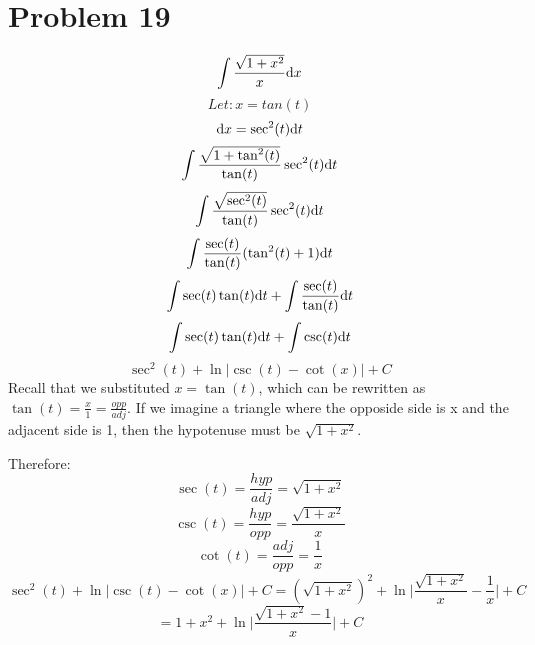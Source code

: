 \documentclass[letterpaper, 12pt]{math}
\begin{document}
\section*{Problem 19}
\[ \int{\frac{\sqrt{1+x^{2}}}{x}\mathrm{d}{x}} \]
\[ Let: x = tan(t) \]
\[ \mathrm{d}{x} = \sec^{2}(t)\mathrm{d}{t} \]
\[ \int{\frac{\sqrt{1+\tan^{2}(t)}}{\tan(t)}\sec^{2}(t)\mathrm{d}{t}} \]
\[ \int{\frac{\sqrt{\sec^{2}(t)}}{\tan(t)}\sec^{2}(t)\mathrm{d}{t}} \]
\[ \int{\frac{\sec(t)}{\tan(t)}(\tan^{2}(t)+1)\mathrm{d}{t}} \]
\[ \int{\sec(t)\tan(t)\mathrm{d}{t}}+\int{\frac{\sec(t)}{\tan(t)}\mathrm{d}{t}} \]
\[ \int{\sec(t)\tan(t)\mathrm{d}{t}}+\int{\csc(t)}\mathrm{d}{t} \]
\[ \sec^{2}(t)+\ln|\csc(t)-\cot(x)|+C \]
Recall that we substituted \( x=\tan(t) \), which can be rewritten as
\( \tan(t) = \frac{x}{1} = \frac{opp}{adj} \). If we imagine a triangle where
the opposide side is x and the adjacent side is 1, then the hypotenuse must be
\( \sqrt{1+x^{2}} \).
\begin{center}
\end{center}
Therefore:
\[ \sec(t) = \frac{hyp}{adj} = \sqrt{1+x^{2}} \]
\[ \csc(t) = \frac{hyp}{opp} = \frac{\sqrt{1+x^{2}}}{x} \]
\[ \cot(t) = \frac{adj}{opp} = \frac{1}{x} \]
\[ \sec^{2}(t)+\ln|\csc(t)-\cot(x)|+C = (\sqrt{1+x^{2}})^{2}+
   \ln\bigg|\frac{\sqrt{1+x^{2}}}{x}-\frac{1}{x}\bigg|+C \]
\[ = 1+x^{2}+\ln\bigg|\frac{\sqrt{1+x^{2}}-1}{x}\bigg|+C \]
\end{document}
